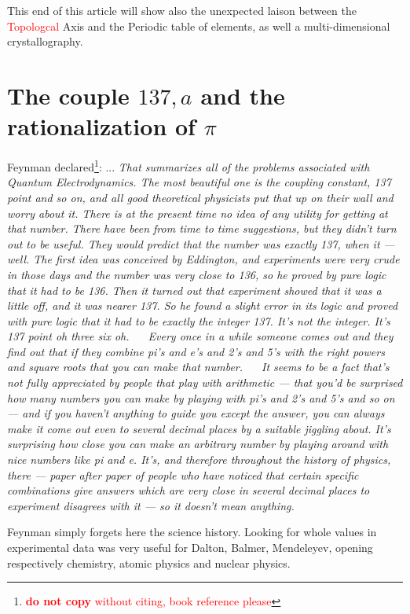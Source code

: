 \documentclass[a4paper,9pt]{article}
\begin{document}
   
   This end of this article will show also the unexpected laison between the \textcolor{red}{Topologcal} Axis and the Periodic table of elements, as well a multi-dimensional crystallography.
   
   
   
   
   
   
   \section {The couple $137, a$ and the rationalization of $\pi$ }
   
   Feynman declared\footnote{\textcolor{red}{\textbf{do not copy} without citing, book reference please}}: ... \textit{That summarizes all of the problems associated with Quantum Electrodynamics. The most beautiful one is the coupling constant, 137 point and so on, and all good theoretical physicists put that up on their wall and worry about it. There is at the present time no idea of any utility for getting at that number. There have been from time to time suggestions, but they didn't turn out to be useful. They would predict that the number was exactly 137, when it — well. The first idea was conceived by Eddington, and experiments were very crude in those days and the number was very close to 136, so he proved by pure logic that it had to be 136. Then it turned out that experiment showed that it was a little off, and it was nearer 137. So he found a slight error in its logic and proved with pure logic that it had to be exactly the integer 137. It's not the integer. It's 137 point oh three six oh.
  Every once in a while someone comes out and they find out that if they combine pi's and e's and 2's and 5's with the right powers and square roots that you can make that number.
  It seems to be a fact that's not fully appreciated by people that play with arithmetic — that you'd be surprised how many numbers you can make by playing with pi's and 2's and 5's and so on — and if you haven't anything to guide you except the answer, you can always make it come out even to several decimal places by a suitable jiggling about. It's surprising how close you can make an arbitrary number by playing around with nice numbers like pi and e. It's, and therefore throughout the history of physics, there — paper after paper of people who have noticed that certain specific combinations give answers which are very close in several decimal places to experiment disagrees with it — so it doesn't mean anything.}
  
Feynman simply forgets here the science history. Looking for whole values in experimental data was very useful for Dalton, Balmer, Mendeleyev, opening respectively chemistry, atomic physics and nuclear physics.
\end{document}
